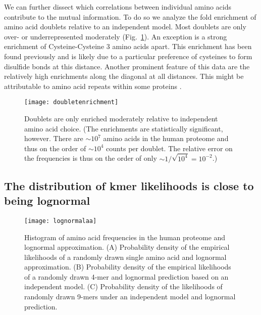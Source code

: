 \documentclass[superscriptaddress,twocolumn,pre]{revtex4}
\newcommand{\<}{\langle}
\renewcommand{\>}{\rangle}
\begin{document}
We can further dissect which correlations between individual amino acids contribute to the mutual information. To do so we analyze the fold enrichment of amino acid doublets relative to an independent model. Most doublets are only over- or underrepresented moderately (Fig.~\ref{figdoubletentrichment}). An exception is a strong enrichment of Cysteine-Cysteine 3 amino acids apart. This enrichment has been found previously \cite{Greenbaum2014} and is likely due to a particular preference of cysteines to form disulfide bonds at this distance. Another prominent feature of this data are the relatively high enrichments along the diagonal at all distances. This might be attributable to amino acid repeats within some proteins \cite{Turjanski2018}.

\begin{figure}
    \texttt{[image: doubletenrichment]}
    \caption{Doublets are only enriched moderately relative to independent amino acid choice. (The enrichments are statistically significant, however. There are $\sim 10^7$ amino acids in the human proteome and thus on the order of $\sim 10^4$ counts per doublet. The relative error on the frequencies is thus on the order of only $\sim 1/\sqrt{10^4} = 10^{-2}$.)
    \label{figdoubletentrichment}
    }
\end{figure}

\subsection{The distribution of kmer likelihoods is close to being lognormal}

\begin{figure}
    \texttt{[image: lognormalaa]}
    \caption{Histogram of amino acid frequencies in the human proteome and lognormal approximation. (A) Probability density of the empirical likelihoods of a randomly drawn single amino acid and lognormal approximation. (B) Probability density of the empirical likelihoods of a randomly drawn 4-mer and lognormal prediction based on an independent model.
    (C) Probability density of the likelihoods of randomly drawn 9-mers under an independent model and lognormal prediction.
    \label{figlognormalaa}
    }
\end{figure}
\end{document}
